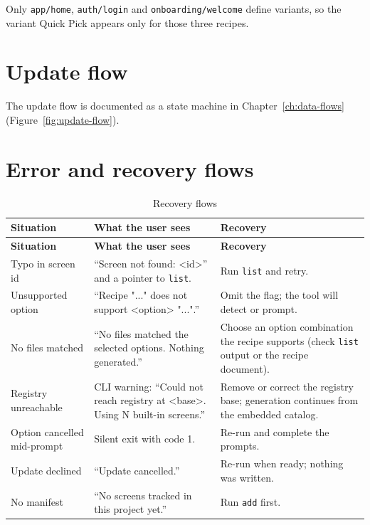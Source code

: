 Only \texttt{app/home}, \texttt{auth/login} and \texttt{onboarding/welcome} define
variants, so the variant Quick Pick appears only for those three recipes.

\section{Update flow}

The update flow is documented as a state machine in Chapter~\ref{ch:data-flows}
(Figure~\ref{fig:update-flow}).

\section{Error and recovery flows}

\begin{longtable}{@{}L{4.2cm}L{5cm}L{5.2cm}@{}}
\caption{Recovery flows}\\
\toprule
\textbf{Situation} & \textbf{What the user sees} & \textbf{Recovery} \\
\midrule
\endfirsthead
\toprule
\textbf{Situation} & \textbf{What the user sees} & \textbf{Recovery} \\
\midrule
\endhead
Typo in screen id & ``Screen not found: <id>'' and a pointer to \texttt{list}. & Run
\texttt{list} and retry. \\
Unsupported option & ``Recipe "..." does not support <option> "...".'' & Omit the
flag; the tool will detect or prompt. \\
No files matched & ``No files matched the selected options. Nothing generated.'' &
Choose an option combination the recipe supports (check \texttt{list} output or
the recipe document). \\
Registry unreachable & CLI warning: ``Could not reach registry at <base>. Using N
built-in screens.'' & Remove or correct the registry base; generation continues
from the embedded catalog. \\
Option cancelled mid-prompt & Silent exit with code 1. & Re-run and complete the
prompts. \\
Update declined & ``Update cancelled.'' & Re-run when ready; nothing was written. \\
No manifest & ``No screens tracked in this project yet.'' & Run \texttt{add} first. \\
\bottomrule
\end{longtable}

